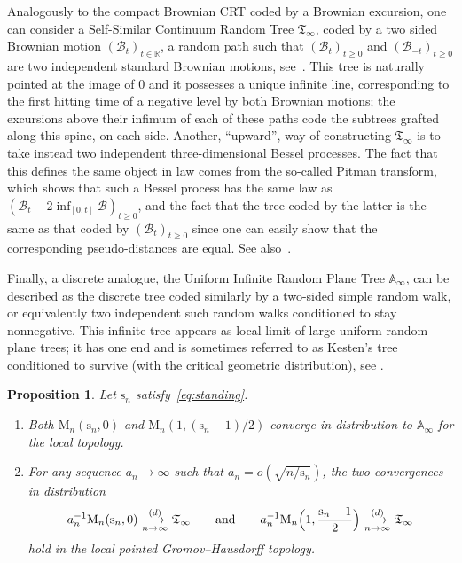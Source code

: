 \documentclass[10pt]{amsart}
\theoremstyle{plain}
\newtheorem{proposition}[theorem]{Proposition}
\theoremstyle{definition}
\theoremstyle{remark}
\newcommand{\R}{\mathbb{R}}
\newcommand{\Map}{\mathrm{M}}
\newcommand{\Tree}{\mathfrak{T}}
\newcommand{\spar}{\mathrm{s}}
\newcommand{\cvloi}[1][n]{\,\mathop{\longrightarrow}^{(d)}_{#1 \to \infty}\,}
\begin{document}
Analogously to the compact Brownian CRT coded by a Brownian excursion, one can consider a Self-Similar Continuum Random Tree $\Tree_\infty$, coded by a two sided Brownian motion $(\mathcal{B}_t)_{t \in \R}$, \ie a random path such that $(\mathcal{B}_t)_{t \ge 0}$ and $(\mathcal{B}_{-t})_{t \ge 0}$ are two independent standard Brownian motions, see~\cite[\S 2.5]{Ald91c}. This tree is naturally pointed at the image of $0$ and it possesses a unique infinite line, corresponding to the first hitting time of a negative level by both Brownian motions; the excursions above their infimum of each of these paths code the subtrees grafted along this spine, on each side. Another, ``upward'', way of constructing $\Tree_\infty$ is to take instead two independent three-dimensional Bessel processes. The fact that this defines the same object in law comes from the so-called Pitman transform, which shows that such a Bessel process has the same law as $(\mathcal{B}_t - 2\inf_{[0,t]} \mathcal{B})_{t \ge 0}$, and the fact that the tree coded by the latter is the same as that coded by $(\mathcal{B}_t)_{t \ge 0}$ since one can easily show that the corresponding pseudo-distances are equal. See also~\cite[\S 7.7.6]{Pit06}.

Finally, a discrete analogue, the Uniform Infinite Random Plane Tree $\mathbb{A}_\infty$, can be described as the discrete tree coded similarly by a two-sided simple random walk, or equivalently two independent such random walks conditioned to stay nonnegative. This infinite tree appears as local limit of large uniform random plane trees; it has one end and is sometimes referred to as Kesten's tree conditioned to survive (with the critical geometric distribution), see \eg \cite[\S 5]{Jan12}.

\begin{proposition}\label{prop:limites_arbres}
Let $\spar_n$ satisfy~\eqref{eq:standing}.
\begin{enumerate}
\item Both $\Map_{n}(\spar_{n},0)$ and $\Map_{n}(1, (\spar_{n}-1)/2)$ converge in distribution to $\mathbb{A}_\infty$ for the local topology.

\item For any sequence $a_n \to \infty$ such that $a_n = o(\sqrt{n/\spar_n})$, the two convergences in distribution
\[
a_n^{-1} \Map_{n}(\spar_{n},0) \cvloi \Tree_\infty
\qquad \text{and} \qquad
a_n^{-1} \Map_{n}\Bigl(1,\frac{\spar_{n}-1}{2} \Bigr) \cvloi \Tree_\infty
\]
hold in the local pointed Gromov--Hausdorff topology.
\end{enumerate}
\end{proposition}
\end{document}
